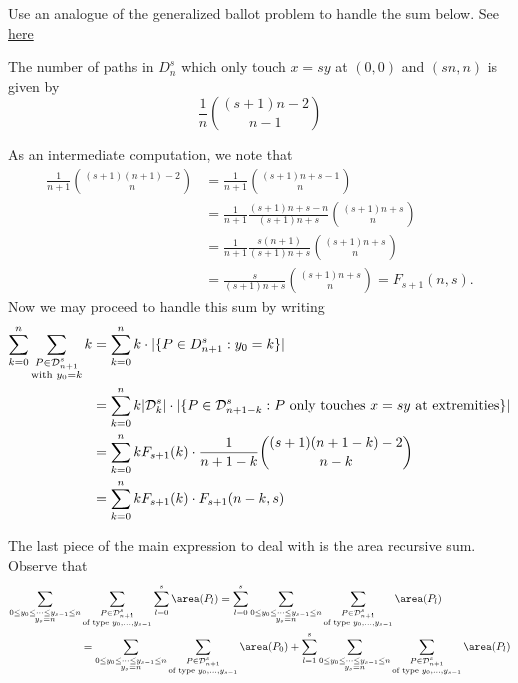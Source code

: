 \documentclass[12pt]{article}
\begin{document}
Use an analogue of the generalized ballot problem to handle the sum below. See \href{https://www.sciencedirect.com/science/article/pii/S0097316503001511}{here}

\begin{lemma}
    The number of paths in $ D_{n}^{s} $ which only touch $ x=sy $ at $ (0,0) $ and $ (sn,n) $ is given by
    \[
        \frac{1}{n}\binom{(s+1)n -2}{n-1}
    \]
\end{lemma}
\noindent As an intermediate computation, we note that
\begin{align*}
    \frac{1}{n+1}\binom{(s+1)(n+1)-2}{n}&= \frac{1}{n+1}\binom{(s+1)n+s-1}{n}\\
    &=\frac{1}{n+1}\frac{(s+1)n+s-n}{(s+1)n+s}\binom{(s+1)n+s}{n}\\
    &=\frac{1}{n+1}\frac{s(n+1)}{(s+1)n+s}\binom{(s+1)n+s}{n} \\
    &=\frac{s}{(s+1)n+s}\binom{(s+1)n+s}{n} = F_{s+1}(n,s) .
\end{align*}
Now we may proceed to handle this sum by writing 
\begin{align*}
    \sum_{k=0}^{n}\sum_{\substack{P\in \mathcal{D}_{n+1}^{s}\\\text{with }y_{0}=k}}k &= \sum_{k=0}^{n} k\cdot |\{P\in D_{n+1}^{s}: y_{0}=k\}| \\
    &= \sum_{k=0}^{n}k |\mathcal{D}_{k}^{s}| \cdot |\{P\in \mathcal{D}_{n+1-k}^{s}: P\text{ only touches $ x=sy $ at extremities} \}| \\
    &= \sum_{k=0}^{n} kF_{s+1}(k) \cdot \frac{1}{n+1-k} \binom{(s+1)(n+1-k) -2 }{n-k}\\
    &= \sum_{k=0}^{n}kF_{s+1}(k)\cdot F_{s+1}(n-k,s)
\end{align*}


The last piece of the main expression to deal with is the area recursive sum. Observe that
\begin{align*}
    \sum_{\substack{0\leq y_{0}\leq \cdots\leq y_{s-1}\leq n\\y_{s}=n}} &\sum_{\substack{P\in \mathcal{D}_{n+1}^{s}\\\text{of type }y_{0},\ldots, y_{s-1}}}  \sum_{l=0}^{s}\area(P_{l}) = \sum_{l=0}^{s} \sum_{\substack{0\leq y_{0}\leq \cdots\leq y_{s-1}\leq n\\y_{s}=n}} \sum_{\substack{P\in \mathcal{D}_{n+1}^{s}\\\text{of type }y_{0},\ldots, y_{s-1}}} \area(P_{l}) \\
    &= \sum_{\substack{0\leq y_{0}\leq \cdots\leq y_{s-1}\leq n\\y_{s}=n}} \sum_{\substack{P\in \mathcal{D}_{n+1}^{s}\\\text{of type }y_{0},\ldots, y_{s-1}}} \area(P_{0}) +\sum_{l=1}^{s} \sum_{\substack{0\leq y_{0}\leq \cdots\leq y_{s-1}\leq n\\y_{s}=n}} \sum_{\substack{P\in \mathcal{D}_{n+1}^{s}\\\text{of type }y_{0},\ldots, y_{s-1}}} \area(P_{l}) \\
\end{align*}
\end{document}
